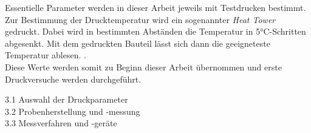   Essentielle Parameter werden in dieser Arbeit jeweils mit Testdrucken bestimmt. Zur Bestimmung der Drucktemperatur wird ein sogenannter \textit{Heat Tower} gedruckt. Dabei wird in bestimmten Abständen die Temperatur in 5°C-Schritten abgesenkt. Mit dem gedruckten Bauteil lässt sich dann die geeigneteste Temperatur ablesen. \Autocite{M.Mickan}.\\

  Diese Werte werden somit zu Beginn dieser Arbeit übernommen und erste Druckversuche werden durchgeführt. 

\autocite{M.Mickan}

3.1 Auswahl der Druckparameter\\
3.2 Probenherstellung und -messung\\
3.3 Messverfahren und -geräte\\